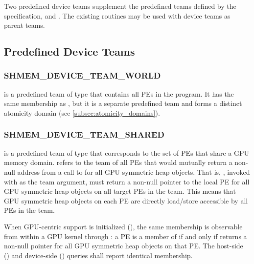
Two predefined device teams supplement the predefined teams defined by the
\openshmem specification,  and
. The existing  routines
may be used with device teams as parent teams.

\subsection{Predefined Device Teams}\label{subsec:predefined_device_teams}

\subsubsection{SHMEM\_DEVICE\_TEAM\_WORLD}\label{subsec:shmem_device_team_world}

 is a predefined team of type
 that contains all \acp{PE} in the \openshmem program.
It has the same membership as , but it is a separate
predefined team and forms a distinct atomicity domain (see
\cref{subsec:atomicity_domains}).

\subsubsection{SHMEM\_DEVICE\_TEAM\_SHARED}\label{subsec:shmem_device_team_shared}

 is a predefined team of type
 that corresponds to the set of \acp{PE} that share a
\ac{GPU} memory domain.  refers to the team
of all \acp{PE} that would mutually return a non-null address from a call to
 for all \ac{GPU} symmetric heap objects. That is,
, invoked with  as the
team argument, must return a non-null pointer to the local \ac{PE} for all
\ac{GPU} symmetric heap objects on all target \acp{PE} in the team. This means
that \ac{GPU} symmetric heap objects on each \ac{PE} are directly load/store
accessible by all \acp{PE} in the team.

When \ac{GPU}-centric support is initialized (),
the same membership is observable from within a \ac{GPU} kernel through
: a \ac{PE} is a member of 
if and only if  returns a non-null pointer for all \ac{GPU}
symmetric heap objects on that \ac{PE}. The host-side ()
and device-side () queries shall report identical membership.

